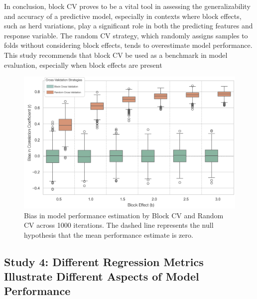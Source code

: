 In conclusion, block CV proves to be a vital tool in assessing the generalizability and accuracy of a predictive model, especially in contexts where block effects, such as herd variations, play a significant role in both the predicting features and response variable. The random CV strategy, which randomly assigns samples to folds without considering block effects, tends to overestimate model performance. This study recommends that block CV be used as a benchmark in model evaluation, especially when block effects are present

\begin{figure}
    \centering
    \includegraphics[width=1\textwidth]{fig_s3_results.jpg}
    \caption{Bias in model performance estimation by Block CV and Random CV across 1000 iterations. The dashed line represents the null hypothesis that the mean performance estimate is zero.}
    \label{fig:s3_results}
\end{figure}

\subsection{Study 4: Different Regression Metrics Illustrate Different Aspects of Model Performance}

